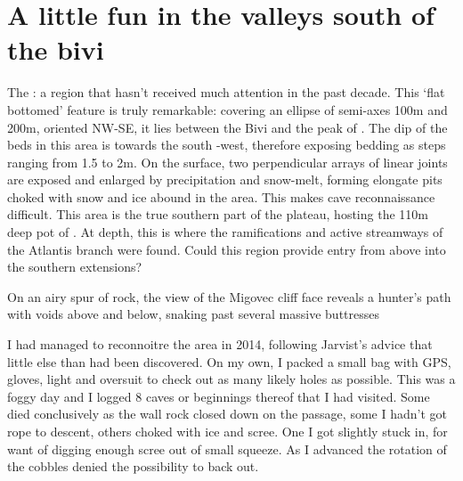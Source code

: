 \section{A little fun in the valleys south of the bivi}


The : a region that hasn't received much attention in the past decade. This `flat bottomed' feature is truly remarkable: covering an ellipse of semi-axes 100m and 200m, oriented NW-SE, it lies between the Bivi and the peak of . The dip of the beds in this area is towards the south -west, therefore exposing bedding as steps ranging from 1.5 to 2m. On the surface, two perpendicular arrays of linear joints are exposed and enlarged by precipitation and snow-melt, forming elongate pits choked with snow and ice abound in the area. This makes cave reconnaissance difficult. This area is the true southern part of the plateau, hosting the 110m deep pot of .  At depth, this is where the ramifications and active streamways of the Atlantis branch were found. Could this region provide entry from above into the southern extensions? 

\begin{marginfigure}
\centering
{}
\label{migface}
\caption{On an airy spur of rock, the view of the Migovec cliff face reveals a hunter's path with voids above and below, snaking past several massive buttresses }
\end{marginfigure}

I had managed to reconnoitre the area in 2014, following Jarvist's advice that little else than  had been discovered. On my own, I packed a small bag with GPS, gloves, light and oversuit to check out as many likely holes as possible. This was a foggy day and I logged 8 caves or beginnings thereof that I had visited. Some died conclusively as the wall rock closed down on the passage, some I hadn't got rope to descent, others choked with ice and scree. One I got slightly stuck in, for want of digging enough scree out of small squeeze. As I advanced the rotation of the cobbles denied the possibility to back out. 

